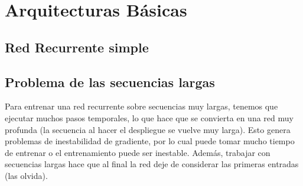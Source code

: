 \section{Arquitecturas Básicas}
\subsection{Red Recurrente simple}

\subsection{Problema de las secuencias largas}
Para entrenar una red recurrente sobre secuencias muy largas, tenemos que ejecutar muchos pasos temporales, lo que hace que se convierta en una red muy profunda (la secuencia al hacer el despliegue se vuelve muy larga). Esto genera problemas de  inestabilidad de gradiente, por lo cual puede tomar mucho tiempo de entrenar o el entrenamiento puede ser inestable. Además, trabajar con secuencias largas hace que al final la red deje de considerar las primeras entradas (las olvida). 